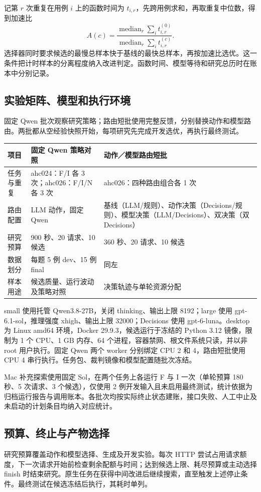 记第 $r$ 次重复在用例 $i$ 上的函数时间为 $t_{i,r}$，先跨用例求和，再取重复中位数，得到加速比
\begin{equation}
 A(c)=\frac{\operatorname{median}_r\sum_i t^{(0)}_{i,r}}
 {\operatorname{median}_r\sum_i t^{(c)}_{i,r}}.
\end{equation}
选择器同时要求候选的最慢总样本快于基线的最快总样本，再按加速比选优。这一条件把计时样本的分离程度纳入改进判定。函数时间、模型等待和研究总历时在账本中分别记录。

\subsection{实验矩阵、模型和执行环境}
固定 Qwen 批次观察研究策略；路由短批使用完整反馈，分别替换动作和模型路由。两批都从空经验快照开始，每项研究先完成开发选优，再执行最终测试。
\par\noindent
\begin{tabularx}{\linewidth}{@{}lXX@{}}\toprule
项目 & 固定 Qwen 策略对照 & 动作／模型路由短批\\\midrule
任务与重复 & ahc024：F/I 各 3 次；ahc026：F/I/N 各 3 次 & ahc026：四种路由组合各 1 次\\
路由配置 & LLM 动作，固定 Qwen & 基线（LLM/规则）、动作决策（Decisions/规则）、模型决策（LLM/Decisions）、双决策（双 Decisions）\\
研究预算 & 900 秒、20 请求、10 候选 & 360 秒、20 请求、10 候选\\
数据划分 & 每题 5 例 dev、15 例 final & 同左\\
样本用途 & 候选质量、运行波动及策略对照 & 决策轨迹与单轮资源分配\\\bottomrule
\end{tabularx}\par

small 使用托管 Qwen3.8-27B，关闭 thinking、输出上限 8192；large 使用 gpt-6.1-sol，推理强度 xhigh、输出上限 32000；Decisions 使用 gpt-6-luna。desktop 为 Linux amd64 环境，Docker 29.9.3，候选运行于冻结的 Python 3.12 镜像，限制为 1 个 CPU、1 GB 内存、64 个进程，容器禁网、根文件系统只读，并以非 root 用户执行。固定 Qwen 两个 worker 分别绑定 CPU 2 和 4，路由短批使用 CPU 4 串行执行。任务包、裁判镜像和模型配置随批次冻结。

Mac 补充探索使用固定 Sol，在两个任务上各运行 F 与 I 一次（单轮预算 180 秒、5 次请求、3 个候选），仅使用 2 例开发输入且未启用最终测试，统计依据为归档运行报告与调用账本。各批次均按实际终止状态建账，接口失败、人工中止及未启动的计划条目均纳入对应统计。

\subsection{预算、终止与产物选择}
研究预算覆盖动作和模型选择、生成及开发实验。每次 HTTP 尝试占用请求额度，下一次请求开始前检查剩余配额与时间；达到候选上限、耗尽预算或主动选择 finish 时结束研究。原生任务在获得中间改进后继续搜索，直至触发上述停止条件。最终测试在候选冻结后执行，其耗时单列。

